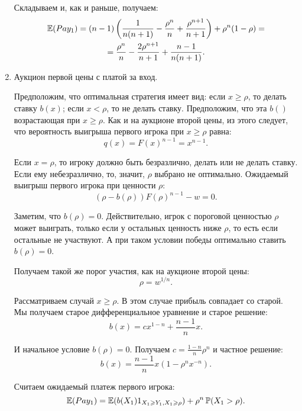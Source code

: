 \begin{enumerate}
Складываем и, как и раньше, получаем:
\begin{multline}
\operatorname{\mathbb{E}}(Pay_{1})=(n-1)\left(\frac{1}{n(n+1)}-\frac{\rho^{n}}{n}+\frac{\rho^{n+1}}{n+1}\right)+\rho^{n}(1-\rho)=\\
=\frac{\rho^{n}}{n}-\frac{2\rho^{n+1}}{n+1}+\frac{n-1}{n(n+1)}.
\end{multline}

\item Аукцион первой цены с платой за вход.

Предположим, что оптимальная стратегия имеет вид: если $ x\geq \rho $, то делать ставку $ b(x) $; если $ x<\rho $, то не делать ставку. Предположим, что эта $ b() $ возрастающая при $ x\geq \rho $. Как и на аукционе второй цены, из этого следует, что вероятность выигрыша первого игрока при $ x\geq\rho $ равна:
\begin{equation}
q(x)=F(x)^{n-1}=x^{n-1}.
\end{equation}


Если $ x=\rho $, то игроку должно быть безразлично, делать или не делать ставку. Если ему небезразлично, то, значит, $ \rho $ выбрано не оптимально. Ожидаемый выигрыш первого игрока при ценности $ \rho $:
\begin{equation}
(\rho-b(\rho))F(\rho)^{n-1}-w=0.
\end{equation}

Заметим, что $ b(\rho)=0 $. Действительно, игрок с пороговой ценностью $ \rho $ может выиграть, только если у остальных ценность ниже $ \rho $, то есть если остальные не участвуют. А при таком условии победы оптимально ставить $ b(\rho)=0 $.

Получаем такой же порог участия, как на аукционе второй цены:
\begin{equation}
\rho=w^{1/n}.
\end{equation}

Рассматриваем случай $ x\geq \rho $. В этом случае прибыль совпадает со старой. Мы получаем старое дифференциальное уравнение и старое решение:
\begin{equation}
b(x)=cx^{1-n}+\frac{n-1}{n}x.
\end{equation}

И начальное условие $ b(\rho)=0 $. Получаем $ c=\frac{1-n}{n}\rho^{n} $ и частное решение:
\begin{equation}
b(x)=\frac{n-1}{n}x(1-\rho^{n}x^{-n}).
\end{equation}

Считаем ожидаемый платеж первого игрока:
\begin{equation}
\operatorname{\mathbb{E}}(Pay_{1})=\operatorname{\mathbb{E}}(b(X_{1})1_{X_{1}\geqslant Y_{1},X_{1}\geqslant \rho})+\rho^{n}\operatorname{\mathbb{P}}(X_{1}>\rho).
\end{equation}


\end{enumerate}
